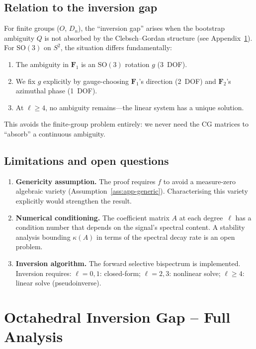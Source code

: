 \documentclass{article}
\theoremstyle{definition}
\theoremstyle{remark}
\newcommand{\SO}{\mathrm{SO}}
\theoremstyle{definition}
\begin{document}
\subsection{Relation to the inversion gap}

For finite groups ($O$, $D_n$), the ``inversion gap'' arises when the
bootstrap ambiguity $Q$ is not absorbed by the Clebsch--Gordan
structure (see Appendix~\ref{app:octa-convergence}). For $\SO(3)$ on
$S^2$, the situation differs fundamentally:
\begin{enumerate}[nosep]
  \item The ambiguity in $\mathbf{F}_1$ is an $\SO(3)$ rotation $g$
    (3~DOF).
  \item We fix $g$ explicitly by gauge-choosing $\mathbf{F}_1$'s
    direction (2~DOF) and $\mathbf{F}_2$'s azimuthal phase (1~DOF).
  \item At $\ell \ge 4$, no ambiguity remains---the linear system has
    a unique solution.
\end{enumerate}
This avoids the finite-group problem entirely: we never need the CG
matrices to ``absorb'' a continuous ambiguity.

\subsection{Limitations and open questions}

\begin{enumerate}
  \item \textbf{Genericity assumption.}
    The proof requires $f$ to avoid a measure-zero algebraic variety
    (Assumption~\ref{ass:app-generic}). Characterising this variety
    explicitly would strengthen the result.

  \item \textbf{Numerical conditioning.}
    The coefficient matrix $A$ at each degree~$\ell$ has a condition
    number that depends on the signal's spectral content. A stability
    analysis bounding $\kappa(A)$ in terms of the spectral decay rate
    is an open problem.

  \item \textbf{Inversion algorithm.}
    The forward selective bispectrum is implemented. Inversion requires:
    $\ell = 0, 1$: closed-form; $\ell = 2, 3$: nonlinear solve;
    $\ell \ge 4$: linear solve (pseudoinverse).
\end{enumerate}

\section{Octahedral Inversion Gap -- Full Analysis}
\label{app:octa-convergence}
\end{document}
